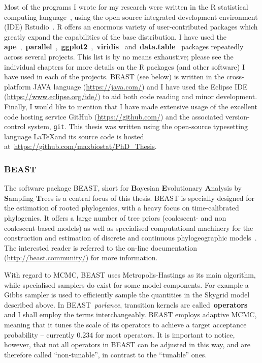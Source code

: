 Most of the programs I wrote for my research were written in the R statistical computing language~\citep{R2017}, using the open source integrated development environment (IDE) Rstudio~\citep{Rstudio2015}.
R offers an enormous variety of user-contributed packages which greatly expand the capabilities of the base distribution. 
I have used the \textbf{ape}~\citep{Paradis2004},~\textbf{parallel}~\citep{R2017},~\textbf{ggplot2}~\citep{Wickham2009},~\textbf{viridis}~\citep{Garnier2018} and~\textbf{data.table}~\citep{Dowle2017} packages repeatedly across several projects.
This list is by no means exhaustive; please see the individual chapters for more details on the R packages (and other software) I have used in each of the projects.
BEAST (see below) is written in the cross-platform JAVA language (\url{https://java.com/}) and I have used the Eclipse IDE (\url{https://www.eclipse.org/ide/}) to aid both code reading and minor development.
Finally, I would like to mention that I have made extensive usage of the excellent code hosting service GitHub (\url{https://github.com/}) and the associated version-control system, \verb|git|.
This thesis was written using the open-source typesetting language \LaTeX and its source code is hosted at~\url{https://github.com/maxbiostat/PhD_Thesis}.

\subsubsection{BEAST}
\label{sec:beast}

The software package BEAST, short for \textbf{B}ayesian \textbf{E}volutionary \textbf{A}nalysis by \textbf{S}ampling \textbf{T}rees\citep{Drummond2007,Drummond2012} is a central focus of this thesis.
BEAST is specially designed for the estimation of rooted phylogenies, with a heavy focus on time-calibrated phylogenies.
It offers a large number of tree priors (coalescent- and non coalescent-based models) as well as specialised computational machinery for the construction and estimation of discrete and continuous phylogeographic models~\citep{Lemey2009,Lemey2010,Pybus2012,Dudas2017}.
The interested reader is referred to the on-line documentation (\url{http://beast.community/}) for more information.

With regard to MCMC, BEAST uses Metropolis-Hastings as its main algorithm, while specialised samplers do exist for some model components.
For example  a Gibbs sampler is used to efficiently sample the quantities in the Skygrid model described above.
In BEAST~\textit{parlance}, transition kernels are called~\textbf{operators} and I shall employ the terms interchangeably. 
BEAST employs adaptive MCMC, meaning that it tunes the scale of its operators to achieve a target acceptance probability -- currently $0.234$ for most operators.
It is important to notice, however, that not all operators in BEAST can be adjusted in this way, and are therefore called ``non-tunable'', in contrast to the ``tunable'' ones.

